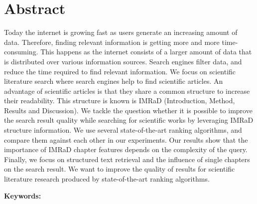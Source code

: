\chapter*{Abstract}
\label{cha:abstract}

Today the internet is growing fast as users generate an increasing amount of data. Therefore, finding relevant information is getting more and more time-consuming. This happens as the internet consists of a larger amount of data that is distributed over various information sources. Search engines filter data, and reduce the time required to find relevant information. We focus on scientific literature search where search engines help to find scientific articles. An advantage of scientific articles is that they share a common structure to increase their readability. This structure is known is IMRaD (Introduction, Method, Results and Discussion). We tackle the question whether it is possible to improve the search result quality while searching for scientific works by leveraging IMRaD structure information. We use several state-of-the-art ranking algorithms, and compare them against each other in our experiments. Our results show that the importance of IMRaD chapter features depends on the complexity of the query. Finally, we focus on structured text retrieval and the influence of single chapters on the search result. We want to improve the quality of results for scientific literature research produced by state-of-the-art ranking algorithms.


\textbf{Keywords:} \mykeywords{}